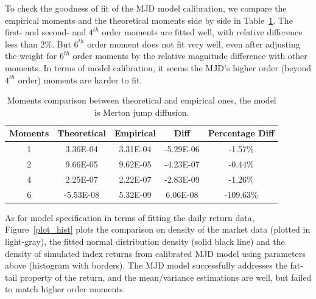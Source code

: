 \documentclass[11pt,reqno,final]{amsart}
\begin{document}
To check the goodness of fit of the MJD model calibration, we compare the empirical moments and the theoretical moments side by side in Table~\ref{tbl::mom_comp}. The first- and second- and $4^{th}$ order moments are fitted well, with relative difference less than 2\%. But $6^{th}$ order moment does not fit very well, even after adjusting the weight for $6^{th}$ order moments by the relative magnitude difference with other moments. In terms of model calibration, it seems the MJD's higher order (beyond $4^{th}$ order) moments are harder to fit.

\begin{table}[H]
\begin{center}
\caption{Moments comparison between theoretical and empirical ones, the model is Merton jump diffusion.}
\begin{tabular}{c|c|c|c|c}
  \hline \hline
Moments	&	Theoretical	&	Empirical	&	Diff	&	Percentage Diff	\\ \hline
1	&	3.36E-04	&	3.31E-04	&	-5.29E-06	&	-1.57\%	\\
2	&	9.66E-05	&	9.62E-05	&	-4.23E-07	&	-0.44\%	\\
4	&	2.25E-07	&	2.22E-07	&	-2.83E-09	&	-1.26\%	\\
6	&	-5.53E-08	&	5.32E-09	&	6.06E-08	&	-109.63\%	\\
  \hline\hline
\end{tabular}\label{tbl::mom_comp}
\end{center}
\end{table}

As for model specification in terms of fitting the daily return data, Figure~\ref{plot_hist} plots the comparison on density of the market data (plotted in light-gray), the fitted normal distribution density (solid black line) and the density of simulated index returns from calibrated MJD model using parameters above (histogram with borders). The MJD model successfully addresses the fat-tail property of the return, and the mean/variance estimations are well, but failed to match higher order moments.
\end{document}
